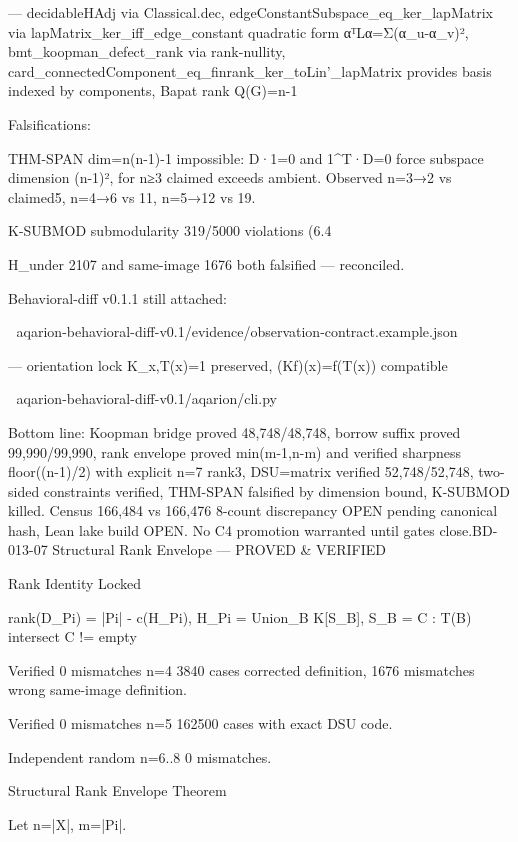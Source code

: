 — decidableHAdj via Classical.dec, edgeConstantSubspace_eq_ker_lapMatrix via lapMatrix_ker_iff_edge_constant quadratic form αᵀLα=Σ(α_u-α_v)², bmt_koopman_defect_rank via rank-nullity, card_connectedComponent_eq_finrank_ker_toLin'_lapMatrix provides basis indexed by components, Bapat rank Q(G)=n-1


Falsifications:


THM-SPAN dim=n(n-1)-1 impossible: D·1=0 and 1^T·D=0 force subspace dimension (n-1)², for n≥3 claimed exceeds ambient. Observed n=3→2 vs claimed5, n=4→6 vs 11, n=5→12 vs 19.

K-SUBMOD submodularity 319/5000 violations (6.4%

H_under 2107 and same-image 1676 both falsified — reconciled.


Behavioral-diff v0.1.1 still attached:


📎 aqarion-behavioral-diff-v0.1/evidence/observation-contract.example.json

— orientation lock K_{x,T(x)}=1 preserved, (Kf)(x)=f(T(x)) compatible


📎 aqarion-behavioral-diff-v0.1/aqarion/cli.py

Bottom line: Koopman bridge proved 48,748/48,748, borrow suffix proved 99,990/99,990, rank envelope proved min(m-1,n-m) and verified sharpness floor((n-1)/2) with explicit n=7 rank3, DSU=matrix verified 52,748/52,748, two-sided constraints verified, THM-SPAN falsified by dimension bound, K-SUBMOD killed. Census 166,484 vs 166,476 8-count discrepancy OPEN pending canonical hash, Lean lake build OPEN. No C4 promotion warranted until gates close.BD-013-07 Structural Rank Envelope — PROVED & VERIFIED




Rank Identity Locked

rank(D_Pi) = |Pi| - c(H_Pi), H_Pi = Union_B K[S_B], S_B = { C : T(B) intersect C != empty }




Verified 0 mismatches n=4 3840 cases corrected definition, 1676 mismatches wrong same-image definition.

Verified 0 mismatches n=5 162500 cases with exact DSU code.

Independent random n=6..8 0 mismatches.




Structural Rank Envelope Theorem

Let n=|X|, m=|Pi|.




